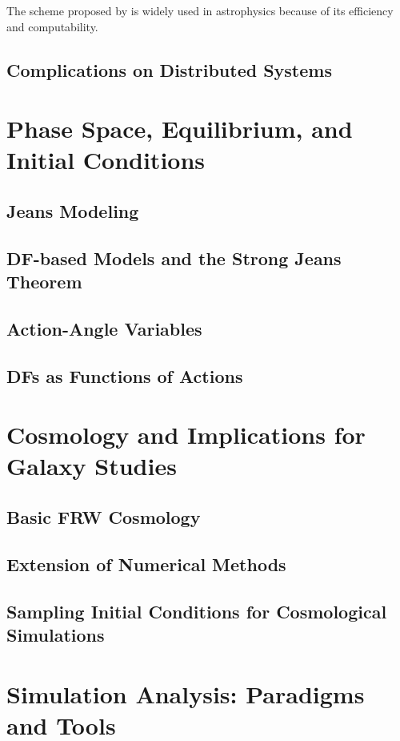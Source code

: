The scheme proposed by \citet{barnes_hut} is widely used in astrophysics because of its efficiency and computability.

\subsection{Complications on Distributed Systems}

\section{Phase Space, Equilibrium, and Initial Conditions} \label{sec:galaxy_ics}
\subsection{Jeans Modeling}
\subsection{DF-based Models and the Strong Jeans Theorem}
\subsection{Action-Angle Variables}
\subsection{DFs as Functions of Actions}

\section{Cosmology and Implications for Galaxy Studies} \label{sec:cosmology}
\subsection{Basic FRW Cosmology}
\subsection{Extension of Numerical Methods}
\subsection{Sampling Initial Conditions for Cosmological Simulations}


\section{Simulation Analysis: Paradigms and Tools} \label{sec:analysis_of_sims}
